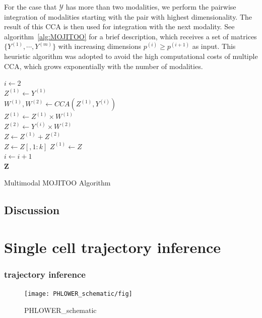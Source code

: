 For the case that $\mathcal{Y}$ has more than two modalities, we perform the pairwise integration of modalities starting with the pair with highest dimensionality. The result of this CCA is then used for integration with the next modality. See algorithm~\ref{alg:MOJITOO} for a brief description, which receives a set of matrices $\{Y^{(1)},\cdots, Y^{(m)}\}$ with increasing dimensions $p^{(i)}\geq p^{(i+1)}$ as input. This heuristic algorithm was adopted to avoid the high computational costs of multiple CCA, which grows exponentially with the number of modalities. 
\begin{algorithm}

	$i \gets 2$ \\
	$Z^{(1)} \gets Y^{(1)}$ \\
	{
		$W^{(1)}, W^{(2)} \gets CCA(Z^{(1)}, Y^{(i)})$ \\ 
		$Z^{(1)} \gets Z^{(1)}\times W^{(1)}$ \\ 
		$Z^{(2)} \gets Y^{(i)}\times W^{(2)}$  \\
		$Z \gets Z^{(1)} + Z^{(2)}$ \\ 
		$Z \gets Z[, 1:k]$ 
		$Z^{(1)} \gets Z$ \\
		$i \gets i+1$  \\
	}
	\Return $\mathbf{Z}$ 
	\caption{Multimodal MOJITOO Algorithm }
	\label{alg:MOJITOO}
\end{algorithm}

\subsection{Discussion}

\section{Single cell trajectory inference}


\subsubsection{trajectory inference}
\begin{figure}[!ht]
	\centering
	\texttt{[image: PHLOWER\_schematic/fig]}
	\vspace{0.1cm}
	\caption[PHLOWER\_schematic.]{PHLOWER\_schematic}
	\label{fig:PHLOWER_schematic}
\end{figure}

